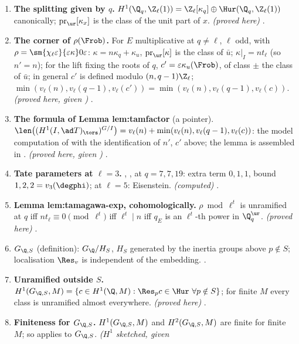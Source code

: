 \begin{sloppypar}
\begin{enumerate}[label=\textbf{\thechapter.\arabic*}]
\item \textbf{The splitting given by $q$.} $H^1(\Q_q,\Z_\ell(1))=\Z_\ell[\kappa_q]\oplus\Hur(\Q_q,\Z_\ell(1))$ canonically; $\operatorname{pr}_{\ur}[\kappa_x]$ is the class of the unit part of $x$.
\emph{(proved here)} .
\item \textbf{The corner of $\rho(\Frob)$.} For $E$ multiplicative at $q\ne\ell$, $\ell$ odd, with $\rho=\sm{\chi_\ell\varepsilon}{\varepsilon\kappa}0\varepsilon$: $\kappa=n\kappa_q+\kappa_u$,
$\operatorname{pr}_{\ur}[\kappa]$ is the class of $\bar u$; $\kappa|_I=nt_\ell$ (so $n'=n$); for the lift fixing the roots of $q$, $c'=\varepsilon\kappa_u(\Frob)$, of class $\pm$ the class of $\bar u$; in
general $c'$ is defined modulo $(n,q-1)\Z_\ell$; $\min(v_\ell(n),v_\ell(q-1),v_\ell(c'))=\min(v_\ell(n),v_\ell(q-1),v_\ell(c))$. \emph{(proved here, given )}
.
\item \textbf{The formula of Lemma lem:tamfactor} (a pointer). $\len\bigl((H^1(I,\ad T)_{\tors})^{G/I}\bigr)=v_\ell(n)+\min(v_\ell(n),v_\ell(q-1),v_\ell(c))$: the model computation of
 with the identification of $n'$, $c'$ above; the lemma is assembled in . \emph{(proved here, given )} .
\item \textbf{Tate parameters at $\ell=3$.} , ,  at $q=7,7,19$: extra term $0,1,1$, bound $1,2,2=v_3(\degphi)$;  at $\ell=5$: Eisenstein.
\emph{(computed)} .
\item \textbf{Lemma lem:tamagawa-exp, cohomologically.} $\rho\bmod\ell^t$ is unramified at $q$ iff $nt_\ell\equiv0\pmod{\ell^t}$ iff $\ell^t\mid n$ iff $q_E$ is an $\ell^t$-th power in $\Q_q^{\ur}$.
\emph{(proved here)} .
\item \textbf{$G_{\Q,S}$} (definition): $G_\Q/H_S$, $H_S$ generated by the inertia groups above $p\notin S$; localisation $\Res_v$ is independent of the embedding. .
\item \textbf{Unramified outside $S$.} $H^1(G_{\Q,S},M)=\{c\in H^1(\Q,M):\Res_pc\in\Hur\ \forall p\notin S\}$; for finite $M$ every class is unramified almost everywhere. \emph{(proved here)}
.
\item \textbf{Finiteness for $G_{\Q,S}$.} $H^1(G_{\Q,S},M)$ and $H^2(G_{\Q,S},M)$ are finite for finite $M$; so  applies to $G_{\Q,S}$. \emph{($H^1$ sketched, given
}
\end{enumerate}
\end{sloppypar}
